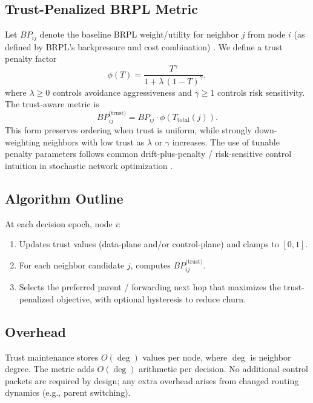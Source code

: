 \documentclass[11pt,a4paper]{article}
\begin{document}
\subsection{Trust-Penalized BRPL Metric}
\label{subsec:metric}
Let $BP_{ij}$ denote the baseline BRPL weight/utility for neighbor $j$ from node $i$ (as defined by BRPL’s backpressure and cost combination) \citep{moeller2016brpl}. We define a trust penalty factor
\begin{equation}
\phi(T)=\frac{T^{\gamma}}{1+\lambda\,(1-T)^{\gamma}},
\label{eq:phi}
\end{equation}
where $\lambda\ge 0$ controls avoidance aggressiveness and $\gamma\ge 1$ controls risk sensitivity. The trust-aware metric is
\begin{equation}
BP^{\text{(trust)}}_{ij}=BP_{ij}\cdot \phi\!\left(T_{\text{total}}(j)\right).
\end{equation}
This form preserves ordering when trust is uniform, while strongly down-weighting neighbors with low trust as $\lambda$ or $\gamma$ increases. The use of tunable penalty parameters follows common drift-plus-penalty / risk-sensitive control intuition in stochastic network optimization \citep{neely2010}.

\subsection{Algorithm Outline}
\label{subsec:algo}
At each decision epoch, node $i$:
\begin{enumerate}[leftmargin=*]
  \item Updates trust values (data-plane and/or control-plane) and clamps to $[0,1]$.
  \item For each neighbor candidate $j$, computes $BP^{\text{(trust)}}_{ij}$.
  \item Selects the preferred parent / forwarding next hop that maximizes the trust-penalized objective, with optional hysteresis to reduce churn.
\end{enumerate}

\subsection{Overhead}
\label{subsec:overhead}
Trust maintenance stores $O(\deg)$ values per node, where $\deg$ is neighbor degree. The metric adds $O(\deg)$ arithmetic per decision. No additional control packets are required by design; any extra overhead arises from changed routing dynamics (e.g., parent switching).
\end{document}
